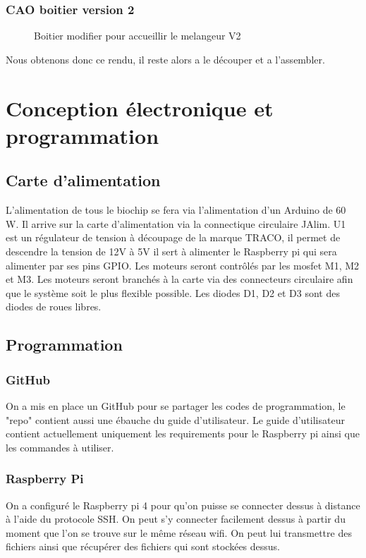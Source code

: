 \documentclass[a4paper, 11pt]{article}
\begin{document}
\subsubsection{CAO boitier version 2}
\begin{figure}[H]
    \centering
    \caption{Boitier modifier pour accueillir le melangeur V2}
    \label{fig:CAO_boitier_V2}
\end{figure}
Nous obtenons donc ce rendu, il reste alors a le découper et a l'assembler.
\newpage
\section{Conception électronique et programmation}
\subsection{Carte d'alimentation}
L'alimentation de tous le biochip se fera via l'alimentation d'un Arduino de 60 W.
Il arrive sur la carte d'alimentation via la connectique circulaire JAlim.
U1 est un régulateur de tension à découpage de la marque TRACO, il permet de descendre la tension de 12V à 5V il sert à alimenter le Raspberry pi qui sera alimenter par ses pins GPIO.
Les moteurs seront contrôlés par les mosfet M1, M2 et M3.
Les moteurs seront branchés à la carte via des connecteurs circulaire afin que le système soit le plus flexible possible.
Les diodes D1, D2 et D3 sont des diodes de roues libres.
\subsection{Programmation}
\subsubsection{GitHub}
On a mis en place un GitHub pour se partager les codes de programmation, le "repo" contient aussi une ébauche du guide d'utilisateur.
Le guide d'utilisateur contient actuellement uniquement les requirements pour le Raspberry pi ainsi que les commandes à utiliser.
\subsubsection{Raspberry Pi}
On a configuré le Raspberry pi 4 pour qu'on puisse se connecter dessus à distance à l'aide du protocole SSH.
On peut s'y connecter facilement dessus à partir du moment que l'on se trouve sur le même réseau wifi.
On peut lui transmettre des fichiers ainsi que récupérer des fichiers qui sont stockées dessus.
\end{document}

